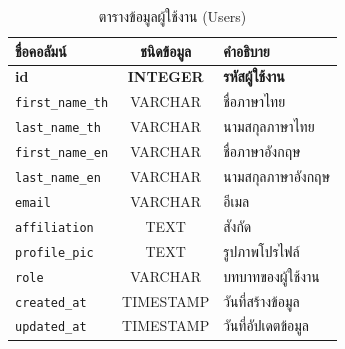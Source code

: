 \begin{table}[h]
    \centering
    \begin{tabular}{|l|c|l|}
        \hline
        ชื่อคอลัมน์               & ชนิดข้อมูล          & คำอธิบาย             \\ \hline
        \textbf{id}           & \textbf{INTEGER} & \textbf{รหัสผู้ใช้งาน} \\ \hline
        \verb |first_name_th| & VARCHAR          & ชื่อภาษาไทย          \\ \hline
        \verb |last_name_th|  & VARCHAR          & นามสกุลภาษาไทย      \\ \hline
        \verb |first_name_en| & VARCHAR          & ชื่อภาษาอังกฤษ        \\ \hline
        \verb |last_name_en|  & VARCHAR          & นามสกุลภาษาอังกฤษ    \\ \hline
        \verb |email|         & VARCHAR          & อีเมล               \\ \hline
        \verb |affiliation|   & TEXT             & สังกัด               \\ \hline
        \verb |profile_pic|   & TEXT             & รูปภาพโปรไฟล์        \\ \hline
        \verb |role|          & VARCHAR          & บทบาทของผู้ใช้งาน     \\ \hline
        \verb |created_at|    & TIMESTAMP        & วันที่สร้างข้อมูล        \\ \hline
        \verb |updated_at|    & TIMESTAMP        & วันที่อัปเดตข้อมูล       \\ \hline
    \end{tabular}
    \caption{ตารางข้อมูลผู้ใช้งาน (Users)}
    \label{tab:user_data}
\end{table}

